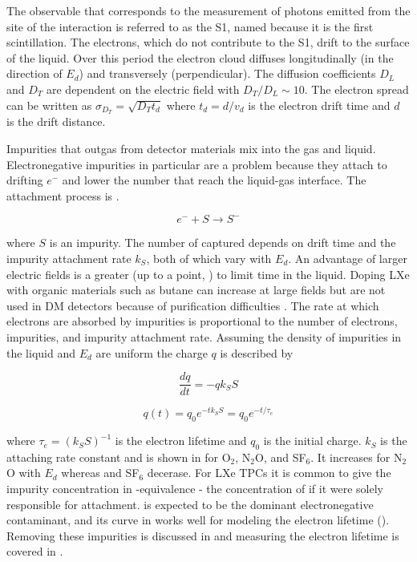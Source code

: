 The observable that corresponds to the measurement of photons emitted from the site of the interaction is referred to as the S1, named
because it is the first scintillation.  The electrons, which do not contribute to the S1, drift to the surface of the liquid.  Over this
period the electron cloud diffuses longitudinally (in the direction of $E_{d}$) and transversely (perpendicular).  The
diffusion coefficients $D_{L}$ and $D_{T}$ are dependent on the electric field with $D_{T}/D_{L} \sim 10$.  The electron spread can
be written as $\sigma_{D_{T}} = \sqrt{D_{T} t_{d}}$ where $t_{d} = d/v_{d}$ is the electron drift time and $d$ is the drift distance.

Impurities that outgas from detector materials mix into the gas and liquid.  Electronegative impurities in particular are a problem
because they attach to drifting $e^{-}$ and
lower the number that reach the liquid-gas interface.  The attachment process
is .

\begin{equation}
e^{-} + S \rightarrow S^{-}
\label{eq:impurity_attach}
\end{equation}

\noindent where $S$ is an impurity.  The number of \electron captured depends on drift time and the impurity attachment rate
$k_{S}$, both of which vary with $E_{d}$.  An advantage of larger electric fields is a greater
\vd (up to a point, ) to limit time in the liquid.  Doping LXe with organic materials such as butane
can increase \vd at large
fields but are not used in DM detectors because of purification difficulties .  The rate at which electrons are
absorbed by impurities is proportional to the number of electrons, impurities, and impurity attachment rate.  Assuming the density
of impurities in the liquid and $E_{d}$ are uniform the charge $q$ is described by

\begin{equation}
\frac{dq}{dt} = -qk_{S}S
\label{eq:lifetime_diff_eq}
\end{equation}

\begin{equation}
q(t) = q_{0}e^{-tk_{S}S} = q_{0}e^{-t/\tau_{e}}
\label{eq:lifetime_equation}
\end{equation}

\noindent where $\tau_{e} = (k_{S}S)^{-1}$ is the electron lifetime and $q_0$ is the initial charge.  $k_{S}$ is the attaching rate
constant and is shown in  for O$_{2}$,
N$_{2}$O, and SF$_{6}$.  It increases for N$_{2}$O with $E_d$ whereas \otwo and SF$_{6}$
decerase.  For LXe TPCs it is common to give the impurity concentration in -equivalence - the concentration of \otwo if it were
solely responsible for \electron attachment.   is expected to be the dominant electronegative contaminant, and its curve
in  works well for modeling the electron lifetime ().  Removing these
impurities is discussed in  and measuring the electron lifetime is covered in
.

